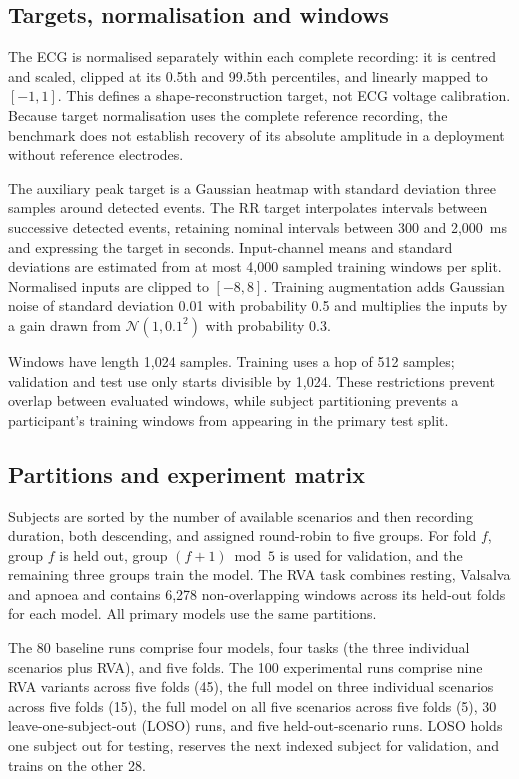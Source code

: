 \documentclass[11pt,a4paper]{article}
\begin{document}
\subsection{Targets, normalisation and windows}

The ECG is normalised separately within each complete recording: it is centred and scaled,
clipped at its 0.5th and 99.5th percentiles, and linearly mapped to $[-1,1]$. This defines a
shape-reconstruction target, not ECG voltage calibration. Because target normalisation uses
the complete reference recording, the benchmark does not establish recovery of its absolute
amplitude in a deployment without reference electrodes.

The auxiliary peak target is a Gaussian heatmap with standard deviation three samples around
detected events. The RR target interpolates intervals between successive detected events,
retaining nominal intervals between 300 and 2,000~ms and expressing the target in seconds.
Input-channel means and standard deviations are estimated from at most 4,000 sampled training
windows per split. Normalised inputs are clipped to $[-8,8]$. Training augmentation adds
Gaussian noise of standard deviation 0.01 with probability 0.5 and multiplies the inputs by
a gain drawn from $\mathcal N(1,0.1^2)$ with probability 0.3.

Windows have length 1,024 samples. Training uses a hop of 512 samples; validation and test
use only starts divisible by 1,024. These restrictions prevent overlap between evaluated
windows, while subject partitioning prevents a participant's training windows from appearing
in the primary test split.

\subsection{Partitions and experiment matrix}

Subjects are sorted by the number of available scenarios and then recording duration, both
descending, and assigned round-robin to five groups. For fold $f$, group $f$ is held out,
group $(f+1)\bmod5$ is used for validation, and the remaining three groups train the model.
The RVA task combines resting, Valsalva and apnoea and contains 6,278 non-overlapping windows
across its held-out folds for each model. All primary models use the same partitions.

The 80 baseline runs comprise four models, four tasks (the three individual scenarios plus
RVA), and five folds. The 100 experimental runs comprise nine RVA variants across five folds
(45), the full model on three individual scenarios across five folds (15), the full model on
all five scenarios across five folds (5), 30 leave-one-subject-out (LOSO) runs, and five
held-out-scenario runs. LOSO holds one subject out for testing, reserves the next indexed
subject for validation, and trains on the other 28.
\end{document}
